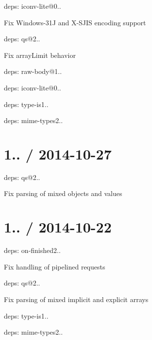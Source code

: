 \begin{DoxyItemize}
\item deps\+: iconv-\/lite@0..
\begin{DoxyItemize}
\item Fix Windows-\/31\+J and X-\/\+S\+J\+I\+S encoding support
\end{DoxyItemize}
\item deps\+: qs@2..
\begin{DoxyItemize}
\item Fix {\ttfamily array\+Limit} behavior
\end{DoxyItemize}
\item deps\+: raw-\/body@1..
\begin{DoxyItemize}
\item deps\+: iconv-\/lite@0..
\end{DoxyItemize}
\item deps\+: type-\/is1..
\begin{DoxyItemize}
\item deps\+: mime-\/types2..
\end{DoxyItemize}
\end{DoxyItemize}

\section*{1.. / 2014-\/10-\/27 }


\begin{DoxyItemize}
\item deps\+: qs@2..
\begin{DoxyItemize}
\item Fix parsing of mixed objects and values
\end{DoxyItemize}
\end{DoxyItemize}

\section*{1.. / 2014-\/10-\/22 }


\begin{DoxyItemize}
\item deps\+: on-\/finished2..
\begin{DoxyItemize}
\item Fix handling of pipelined requests
\end{DoxyItemize}
\item deps\+: qs@2..
\begin{DoxyItemize}
\item Fix parsing of mixed implicit and explicit arrays
\end{DoxyItemize}
\item deps\+: type-\/is1..
\begin{DoxyItemize}
\item deps\+: mime-\/types2..
\end{DoxyItemize}
\end{DoxyItemize}

